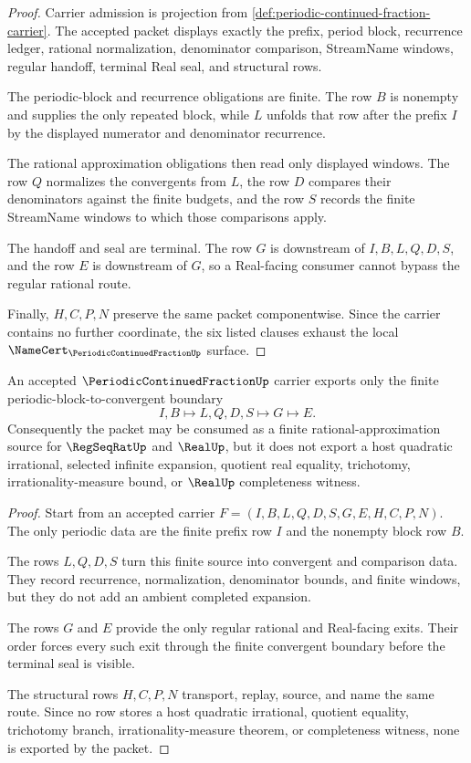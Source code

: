 \begin{proof}
Carrier admission is projection from \autoref{def:periodic-continued-fraction-carrier}. The accepted packet displays exactly the prefix, period block, recurrence ledger, rational normalization, denominator comparison, StreamName windows, regular handoff, terminal Real seal, and structural rows.

The periodic-block and recurrence obligations are finite. The row $B$ is nonempty and supplies the only repeated block, while $L$ unfolds that row after the prefix $I$ by the displayed numerator and denominator recurrence.

The rational approximation obligations then read only displayed windows. The row $Q$ normalizes the convergents from $L$, the row $D$ compares their denominators against the finite budgets, and the row $S$ records the finite StreamName windows to which those comparisons apply.

The handoff and seal are terminal. The row $G$ is downstream of $I,B,L,Q,D,S$, and the row $E$ is downstream of $G$, so a Real-facing consumer cannot bypass the regular rational route.

Finally, $H,C,P,N$ preserve the same packet componentwise. Since the carrier contains no further coordinate, the six listed clauses exhaust the local $\NameCert_{\PeriodicContinuedFractionUp}$ surface.
\end{proof}

\begin{theorem}
\label{thm:periodic-continued-fraction-quadratic-boundary}
An accepted $\PeriodicContinuedFractionUp$ carrier exports only the finite periodic-block-to-convergent boundary
$$
I,B \longmapsto L,Q,D,S \longmapsto G \longmapsto E .
$$
Consequently the packet may be consumed as a finite rational-approximation source for $\RegSeqRatUp$ and $\RealUp$, but it does not export a host quadratic irrational, selected infinite expansion, quotient real equality, trichotomy, irrationality-measure bound, or $\RealUp$ completeness witness.
\end{theorem}
\begin{proof}
Start from an accepted carrier $F=(I,B,L,Q,D,S,G,E,H,C,P,N)$. The only periodic data are the finite prefix row $I$ and the nonempty block row $B$.

The rows $L,Q,D,S$ turn this finite source into convergent and comparison data. They record recurrence, normalization, denominator bounds, and finite windows, but they do not add an ambient completed expansion.

The rows $G$ and $E$ provide the only regular rational and Real-facing exits. Their order forces every such exit through the finite convergent boundary before the terminal seal is visible.

The structural rows $H,C,P,N$ transport, replay, source, and name the same route. Since no row stores a host quadratic irrational, quotient equality, trichotomy branch, irrationality-measure theorem, or completeness witness, none is exported by the packet.
\end{proof}

